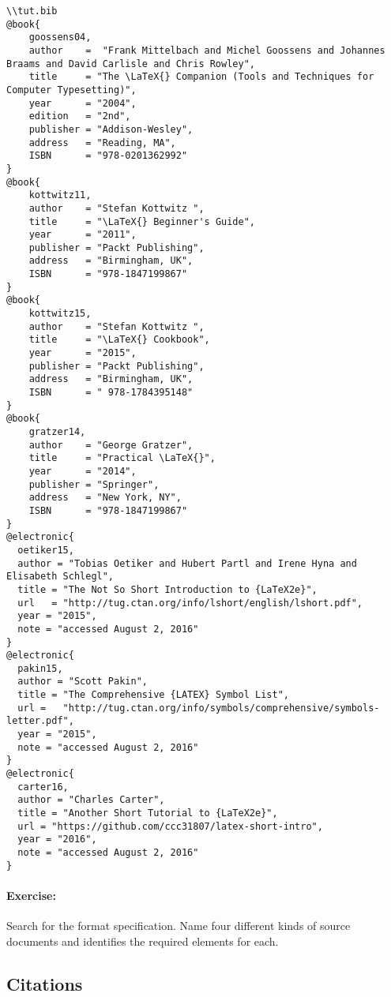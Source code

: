         \begin{verbatim}
\\tut.bib
@book{
    goossens04,
    author    =  "Frank Mittelbach and Michel Goossens and Johannes Braams and David Carlisle and Chris Rowley",
    title     = "The \LaTeX{} Companion (Tools and Techniques for Computer Typesetting)",
    year      = "2004",
    edition   = "2nd",
    publisher = "Addison-Wesley",
    address   = "Reading, MA",
    ISBN      = "978-0201362992"
}
@book{
    kottwitz11,
    author    = "Stefan Kottwitz ",
    title     = "\LaTeX{} Beginner's Guide",
    year      = "2011",
    publisher = "Packt Publishing",
    address   = "Birmingham, UK",
    ISBN      = "978-1847199867"
}
@book{
    kottwitz15,
    author    = "Stefan Kottwitz ",
    title     = "\LaTeX{} Cookbook",
    year      = "2015",
    publisher = "Packt Publishing",
    address   = "Birmingham, UK",
    ISBN      = " 978-1784395148"
}
@book{
    gratzer14,
    author    = "George Gratzer",
    title     = "Practical \LaTeX{}",
    year      = "2014",
    publisher = "Springer",
    address   = "New York, NY",
    ISBN      = "978-1847199867"
}
@electronic{
  oetiker15,
  author = "Tobias Oetiker and Hubert Partl and Irene Hyna and Elisabeth Schlegl",
  title = "The Not So Short Introduction to {LaTeX2e}",
  url   = "http://tug.ctan.org/info/lshort/english/lshort.pdf",
  year = "2015", 
  note = "accessed August 2, 2016"
}
@electronic{
  pakin15,
  author = "Scott Pakin",
  title = "The Comprehensive {LATEX} Symbol List",
  url =   "http://tug.ctan.org/info/symbols/comprehensive/symbols-letter.pdf",
  year = "2015", 
  note = "accessed August 2, 2016"
}
@electronic{
  carter16,
  author = "Charles Carter",
  title = "Another Short Tutorial to {LaTeX2e}",
  url = "https://github.com/ccc31807/latex-short-intro",
  year = "2016", 
  note = "accessed August 2, 2016"
}
        \end{verbatim}

        \paragraph{Exercise:} Search for the \bib{} format specification. Name four different kinds of source documents and identifies the required elements for each.

    \subsection{Citations}
    \label{Citations}
        
